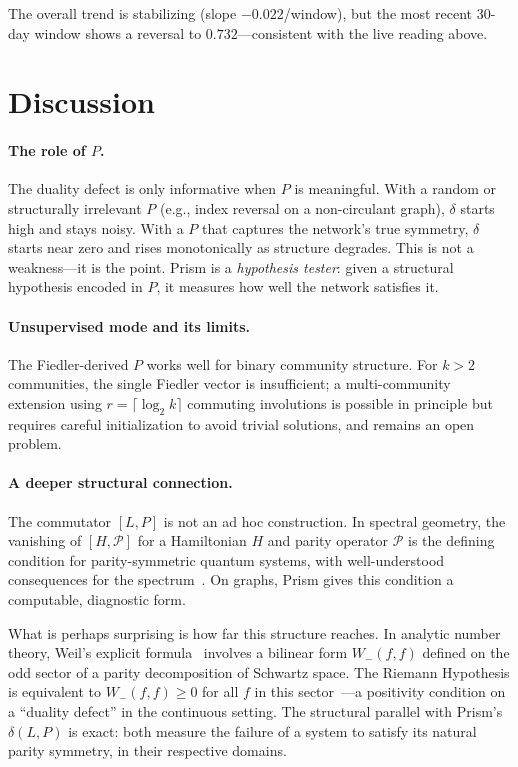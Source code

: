 \documentclass[11pt]{article}
\begin{document}
The overall trend is stabilizing (slope $-0.022$/window), but the
most recent 30-day window shows a reversal to $0.732$---consistent
with the live reading above.

\section{Discussion}

\paragraph{The role of $P$.}
The duality defect is only informative when $P$ is meaningful.
With a random or structurally irrelevant $P$ (e.g., index reversal on
a non-circulant graph), $\delta$ starts high and stays noisy.
With a $P$ that captures the network's true symmetry, $\delta$ starts
near zero and rises monotonically as structure degrades.
This is not a weakness---it is the point.
Prism is a \emph{hypothesis tester}: given a structural hypothesis
encoded in $P$, it measures how well the network satisfies it.

\paragraph{Unsupervised mode and its limits.}
The Fiedler-derived $P$ works well for binary community structure.
For $k > 2$ communities, the single Fiedler vector is insufficient;
a multi-community extension using $r = \lceil \log_2 k \rceil$ commuting
involutions is possible in principle but requires careful initialization
to avoid trivial solutions, and remains an open problem.

\paragraph{A deeper structural connection.}
The commutator $[L, P]$ is not an ad hoc construction.
In spectral geometry, the vanishing of $[H, \mathcal{P}]$ for a
Hamiltonian $H$ and parity operator $\mathcal{P}$ is the defining
condition for parity-symmetric quantum systems, with well-understood
consequences for the spectrum~\cite{Bender1998}.
On graphs, Prism gives this condition a computable, diagnostic form.

What is perhaps surprising is how far this structure reaches.
In analytic number theory, Weil's explicit formula~\cite{Weil1952}
involves a bilinear form $W_-(f,f)$ defined on the odd sector of a
parity decomposition of Schwartz space.
The Riemann Hypothesis is equivalent to $W_-(f,f) \geq 0$ for all $f$
in this sector~\cite{Connes1999}---a positivity condition on a
``duality defect'' in the continuous setting.
The structural parallel with Prism's $\delta(L, P)$ is exact: both
measure the failure of a system to satisfy its natural parity symmetry,
in their respective domains.
\end{document}
